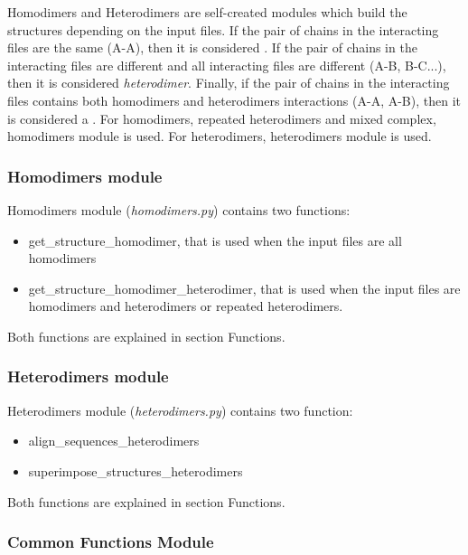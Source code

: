\documentclass[a4paper,10pt]{report}
\begin{document}
Homodimers and Heterodimers are self-created modules which build the structures depending on the input files. If the pair of chains in the interacting files are the same (A-A), then it is considered . If the pair of chains in the interacting files are different and all interacting files are different (A-B, B-C...), then it is considered \textit{heterodimer}. Finally, if the pair of chains in the interacting files contains both homodimers and heterodimers interactions (A-A, A-B), then it is considered a . For homodimers, repeated heterodimers and mixed complex, homodimers module is used. For heterodimers, heterodimers module is used.

\subsubsection{Homodimers module}

Homodimers module (\textit{homodimers.py}) contains two functions:

\begin{itemize}
 \item get\_structure\_homodimer, that is used when the input files are all homodimers
 \item get\_structure\_homodimer\_heterodimer, that is used when the input files are homodimers and heterodimers or repeated heterodimers.
\end{itemize}

\noindent
Both functions are explained in section Functions.

\subsubsection{Heterodimers module}

Heterodimers module (\textit{heterodimers.py}) contains two function:

\begin{itemize}
 \item align\_sequences\_heterodimers
 \item superimpose\_structures\_heterodimers
\end{itemize}

\noindent
Both functions are explained in section Functions.

\subsubsection{Common Functions Module}
\end{document}
